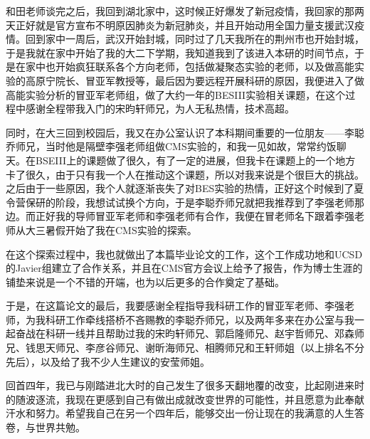 和田老师谈完之后，我回到湖北家中，这时候正好爆发了新冠疫情，我回家的那两天正好就是官方宣布不明原因肺炎为新冠肺炎，并且开始动用全国力量支援武汉疫情。回到家中一周后，武汉开始封城，同时过了几天我所在的荆州市也开始封城，于是我就在家中开始了我的大二下学期，我知道我到了该进入本研的时间节点，于是在家中也开始疯狂联系各个方向老师，包括做凝聚态实验的老师，以及做高能实验的高原宁院长、冒亚军教授等，最后因为要远程开展科研的原因，我便进入了做高能实验分析的冒亚军老师组，做了大约一年的BESIII实验相关课题，在这个过程中感谢全程带我入门的宋昀轩师兄，为人无私热情，技术高超。

同时，在大三回到校园后，我又在办公室认识了本科期间重要的一位朋友——李聪乔师兄，当时他是隔壁李强老师组做CMS实验的，和我一见如故，常常约饭聊天。在BSEIII上的课题做了很久，有了一定的进展，但我卡在课题上的一个地方卡了很久，由于只有我一个人在推动这个课题，所以对我来说是个很巨大的挑战。之后由于一些原因，我个人就逐渐丧失了对BES实验的热情，正好这个时候到了夏令营保研的阶段，我想试试换个方向，于是李聪乔师兄就把我推荐到了李强老师那边。而正好我的导师冒亚军老师和李强老师有合作，我便在冒老师名下跟着李强老师从大三暑假开始了我在CMS实验的探索。

在这个探索过程中，我也就做出了本篇毕业论文的工作，这个工作成功地和UCSD的Javier组建立了合作关系，并且在CMS官方会议上给予了报告，作为博士生涯的铺垫来说是一个不错的开端，也为以后更多的合作奠定了基础。

于是，在这篇论文的最后，我要感谢全程指导我科研工作的冒亚军老师、李强老师，为我科研工作牵线搭桥不吝赐教的李聪乔师兄，以及两年多来在办公室与我一起奋战在科研一线并且帮助过我的宋昀轩师兄、郭启隆师兄、赵宇哲师兄、邓森师兄、钱思天师兄、李彦谷师兄、谢昕海师兄、相腾师兄和王轩师姐（以上排名不分先后），以及给了我不少人生建议的安莹师姐。

回首四年，我已与刚踏进北大时的自己发生了很多天翻地覆的改变，比起刚进来时的随波逐流，我现在更感到自己有做出成就改变世界的可能性，并且愿意为此奉献汗水和努力。希望我自己在另一个四年后，能够交出一份让现在的我满意的人生答卷，与世界共勉。